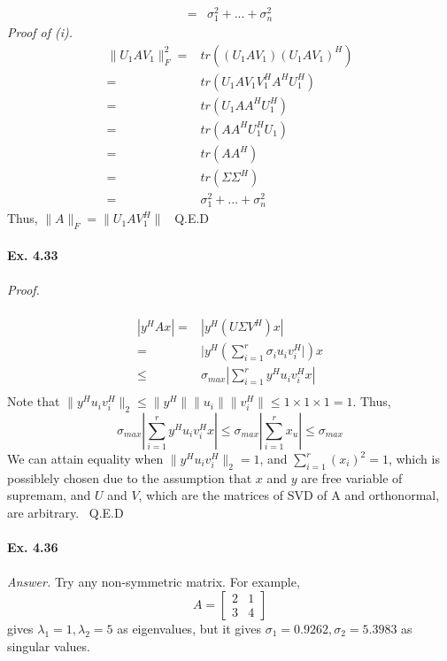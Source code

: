 \documentclass[letterpaper,12pt]{article}
\theoremstyle{definition}
\begin{document}
\begin{spacing}{1.3}{}
\begin{align*}
                 =& \sigma_{1}^2 + ... + \sigma_{n}^2
\end{align*}
\emph{Proof of (i).}
\begin{align*}
   \|U_1 A V_1\|_{F}^{2} =& tr((U_1 A V_1) (U_1 A V_1)^H) \\
                         =& tr(U_1 A V_1 V_{1}^H A^H U_{1}^H) \\
                         =& tr(U_1 A A^H U_{1}^H) \\
                         =& tr(A A^H U_{1}^H U_{1}) \\
                         =& tr(AA^H) \\
                         =& tr(\Sigma \Sigma^H) \\
                         =& \sigma_{1}^2 + ... + \sigma_{n}^2
\end{align*}
Thus, $\|A\|_F = \|U_1 A V_{1}^H\|$ \ Q.E.D \\\\
\textbf{Ex. 4.33}\\\\
\emph{Proof.} \\\\
\begin{align*}
 |y^H A x|  =& |y^H (U \Sigma V^H) x| \\
            =& |y^H (\sum_{i=1}^{r} \sigma_i u_i v_{i}^H |)x \\
         \leq& \sigma_{max} | \sum_{i=1}^{r} y^H u_i v_{i}^H x |\\
\end{align*}
Note that $\| y^H u_i v_{i}^H \|_2 \leq \| y^H \| \|u_i\| \|v_{i}^H\| \leq 1 \times 1 \times 1 = 1 $. Thus,
\[\sigma_{max} | \sum_{i=1}^{r} y^H u_i v_{i}^H x | \leq \sigma_{max} | \sum_{i=1}^{r} x_u | \leq \sigma_{max} \]
We can attain equality when $\| y^H u_i v_{i}^H \|_2 = 1$, and $\sum_{i=1}^{r} (x_i)^2 = 1$, which is possiblely chosen due to the assumption that $x$ and $y$ are free variable of supremam, and $U$ and $V$, which are the matrices of SVD of A and orthonormal, are arbitrary. \ Q.E.D \\\\
\textbf{Ex. 4.36}\\\\
\emph{Answer.} Try any non-symmetric matrix. For example,
\[A =
\begin{bmatrix}
  2 & 1 \\
  3 & 4
\end{bmatrix}
\]
gives $\lambda_1 = 1, \lambda_2 = 5$ as eigenvalues, but it gives $\sigma_1 = 0.9262, \sigma_2 = 5.3983$ as singular values. \\\\

\end{spacing}
\end{document}
